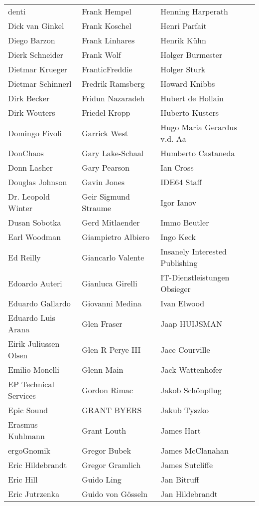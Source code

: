 \begin{tabular}{p{4.5cm}p{4.5cm}p{4.5cm}}
denti & Frank Hempel & Henning Harperath \\
Dick van Ginkel & Frank Koschel & Henri Parfait \\
Diego Barzon & Frank Linhares & Henrik Kühn \\
Dierk Schneider & Frank Wolf & Holger Burmester \\
Dietmar Krueger & FranticFreddie & Holger Sturk \\
Dietmar Schinnerl & Fredrik Ramsberg & Howard Knibbs \\
Dirk Becker & Fridun Nazaradeh & Hubert de Hollain \\
Dirk Wouters & Friedel Kropp & Huberto Kusters \\
Domingo Fivoli & Garrick West & Hugo Maria Gerardus v.d. Aa \\
DonChaos & Gary Lake-Schaal & Humberto Castaneda \\
Donn Lasher & Gary Pearson & Ian Cross \\
Douglas Johnson & Gavin Jones & IDE64 Staff \\
Dr. Leopold Winter & Geir Sigmund Straume & Igor Ianov \\
Dusan Sobotka & Gerd Mitlaender & Immo Beutler \\
Earl Woodman & Giampietro Albiero & Ingo Keck \\
Ed Reilly & Giancarlo Valente & Insanely Interested Publishing \\
Edoardo Auteri & Gianluca Girelli & IT-Dienstleistungen Obsieger \\
Eduardo Gallardo & Giovanni Medina & Ivan Elwood \\
Eduardo Luis Arana & Glen Fraser & Jaap HUIJSMAN \\
Eirik Juliussen Olsen & Glen R Perye III & Jace Courville \\
Emilio Monelli & Glenn Main & Jack Wattenhofer \\
EP Technical Services & Gordon Rimac & Jakob Schönpflug \\
Epic Sound & GRANT BYERS & Jakub Tyszko \\
Erasmus Kuhlmann & Grant Louth & James Hart \\
ergoGnomik & Gregor Bubek & James McClanahan \\
Eric Hildebrandt & Gregor Gramlich & James Sutcliffe \\
Eric Hill & Guido Ling & Jan Bitruff \\
Eric Jutrzenka & Guido von Gösseln & Jan Hildebrandt \\

\end{tabular}

